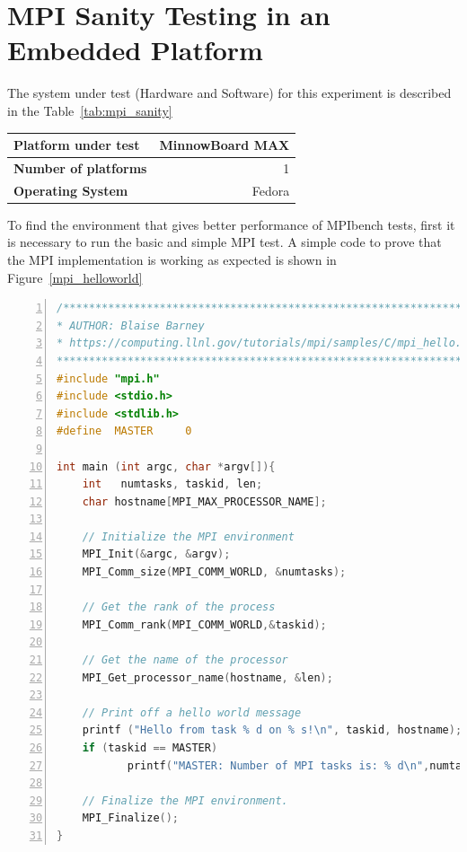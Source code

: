 \section{MPI Sanity Testing in an Embedded Platform}

The system under test (Hardware and Software) for this experiment is described
in the Table~\ref{tab:mpi_sanity}

    \begin{center}
    \begin{tabular}{ | l | r |}
        \hline
        \textbf{Platform under test} &  MinnowBoard MAX \\ \hline
        \textbf{Number of platforms}  & 1  \\ \hline
        \textbf{Operating System} & Fedora  \\ \hline
    \end{tabular}
    \label{tab:mpi_sanity}
    \end{center}

To find the environment that gives better performance of  MPIbench tests, first
it is necessary to run the basic and simple MPI test. A simple code to prove
that the MPI implementation is working as expected is shown in
Figure~\ref{mpi_helloworld}


\begin{minipage}{\textwidth}
\end{minipage}

\begin{minipage}{\textwidth}
\begin{lstlisting}[frame=single,numbers=left,breaklines=true,language=C]
/*************************************************************************
* AUTHOR: Blaise Barney
* https://computing.llnl.gov/tutorials/mpi/samples/C/mpi_hello.c
**************************************************************************/
#include "mpi.h"
#include <stdio.h>
#include <stdlib.h>
#define  MASTER     0

int main (int argc, char *argv[]){
    int   numtasks, taskid, len;
    char hostname[MPI_MAX_PROCESSOR_NAME];

    // Initialize the MPI environment
    MPI_Init(&argc, &argv);
    MPI_Comm_size(MPI_COMM_WORLD, &numtasks);

    // Get the rank of the process
    MPI_Comm_rank(MPI_COMM_WORLD,&taskid);

    // Get the name of the processor
    MPI_Get_processor_name(hostname, &len);

    // Print off a hello world message
    printf ("Hello from task % d on % s!\n", taskid, hostname);
    if (taskid == MASTER)
           printf("MASTER: Number of MPI tasks is: % d\n",numtasks);
    
    // Finalize the MPI environment.
    MPI_Finalize();
}
\end{lstlisting}
\label{mpi_helloworld} 
\end{minipage}

